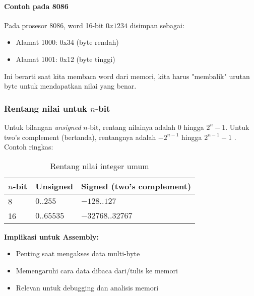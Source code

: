 \documentclass[../main.tex]{subfiles}
\begin{document}
            \paragraph{Contoh pada 8086}
                Pada prosesor 8086, word 16-bit \(0x1234\) disimpan sebagai:
                \begin{itemize}
                    \item Alamat 1000: 0x34 (byte rendah)
                    \item Alamat 1001: 0x12 (byte tinggi)
                \end{itemize}

                Ini berarti saat kita membaca word dari memori, kita harus "membalik" urutan byte untuk mendapatkan nilai yang benar.

        \subsubsection{Rentang nilai untuk \texorpdfstring{$n$}{n}-bit}
            Untuk bilangan \textit{unsigned} $n$-bit, rentang nilainya adalah $0$ hingga $2^n-1$. Untuk two's complement (bertanda), rentangnya adalah $-2^{n-1}$ hingga $2^{n-1}-1$ \cite{wiki_binary_number,wiki_two_complement}. Contoh ringkas:
            \begin{table}[H]
                \centering
                \caption{Rentang nilai integer umum}
                \begin{tabular}{lll}
                    \toprule
                    \textbf{$n$-bit} & \textbf{Unsigned} & \textbf{Signed (two's complement)} \\
                    \midrule
                    8  & $0..255$       & $-128..127$ \\
                    16 & $0..65535$     & $-32768..32767$ \\
                    \bottomrule
                \end{tabular}
                \label{tab:range-nbit}
            \end{table}

            \textbf{Implikasi untuk Assembly:}
            \begin{itemize}
                \item Penting saat mengakses data multi-byte
                \item Memengaruhi cara data dibaca dari/tulis ke memori
                \item Relevan untuk debugging dan analisis memori
            \end{itemize}
\end{document}
